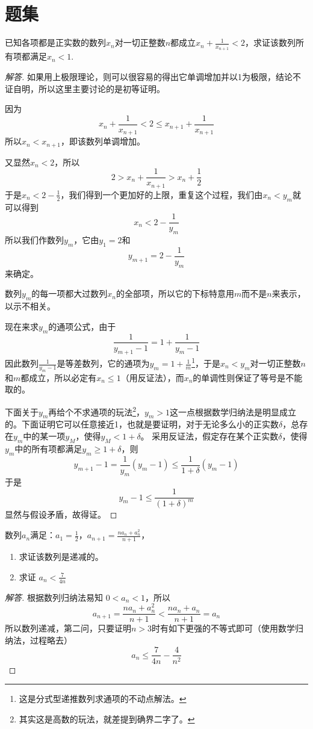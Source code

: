 
\section{题集}
\label{sec:number-sequence-exercise}
\begin{exercise}
  已知各项都是正实数的数列$x_n$对一切正整数$n$都成立$x_n+\frac{1}{x_{n+1}}<2$，求证该数列所有项都满足$x_n<1$.
\end{exercise}
\begin{proof}[解答]
  如果用上极限理论，则可以很容易的得出它单调增加并以1为极限，结论不证自明，所以这里主要讨论的是初等证明。

因为
$$
x_n+\frac{1}{x_{n+1}}<2 \leqslant 
x_{n+1}+\frac{1}{x_{n+1}}
$$
所以$x_n<x_{n+1}$，即该数列单调增加。

又显然$x_n<2$，所以
$$
2>x_n+\frac{1}{x_{n+1}}>x_n+\frac{1}{2}
$$
于是$x_n<2-\frac{1}{2}$，我们得到一个更加好的上限，重复这个过程，我们由$x_n<y_m$就可以得到
$$
x_n<2-\frac{1}{y_m}
$$
所以我们作数列$y_m$，它由$y_1=2$和
$$
y_{m+1}=2-\frac{1}{y_m}
$$
来确定。

数列$y_m$的每一项都大过数列$x_n$的全部项，所以它的下标特意用$m$而不是$n$来表示，以示不相关。

现在来求$y_m$的通项公式，由于
$$
\frac{1}{y_{m+1}-1}=1+\frac{1}{y_{m}-1}
$$
因此数列$\frac{1}{y_m-1}$是等差数列，它的通项为$y_m=1+\frac{1}{m}$\footnote{这是分式型递推数列求通项的不动点解法。}，于是$x_n<y_m$对一切正整数$n$和$m$都成立，所以必定有$x_n\leqslant 1$（用反证法），而$x_n$的单调性则保证了等号是不能取的。

下面关于$y_m$再给个不求通项的玩法\footnote{其实这是高数的玩法，就差提到确界二字了。}，$y_m>1$这一点根据数学归纳法是明显成立的。下面证明它可以任意接近1，也就是要证明，对于无论多么小的正实数$\delta$，总存在$y_m$中的某一项$y_M$，使得$y_M<1+\delta$。
采用反证法，假定存在某个正实数$\delta$，使得$y_m$中的所有项都满足$y_m\geqslant 1+\delta$，则
$$
y_{m+1}-1=\frac{1}{y_m}(y_m-1)\leqslant 
\frac{1}{1+\delta}(y_m-1)
$$
于是
$$
y_m-1\leqslant \frac{1}{(1+\delta)^m}
$$
显然与假设矛盾，故得证。
\end{proof}

\begin{exercise}
  数列$a_n$满足：$a_1=\frac{1}{2}$，$a_{n+1}=\frac{na_n+a_n^2}{n+1}$，
  \begin{enumerate}
  \item 求证该数列是递减的。
  \item 求证 $a_n < \frac{7}{4n}$
  \end{enumerate}
\end{exercise}
\begin{proof}[解答]
  根据数列归纳法易知 $0<a_n<1$，所以
  \begin{equation*}
    a_{n+1}=\frac{na_n+a_n^2}{n+1} < \frac{na_n+a_n}{n+1} = a_n
  \end{equation*}
  所以数列递减，第二问，只要证明$n>3$时有如下更强的不等式即可（使用数学归纳法，过程略去）
  \begin{equation*}
    a_n \leqslant \frac{7}{4n}-\frac{4}{n^2}
  \end{equation*}
\end{proof}

